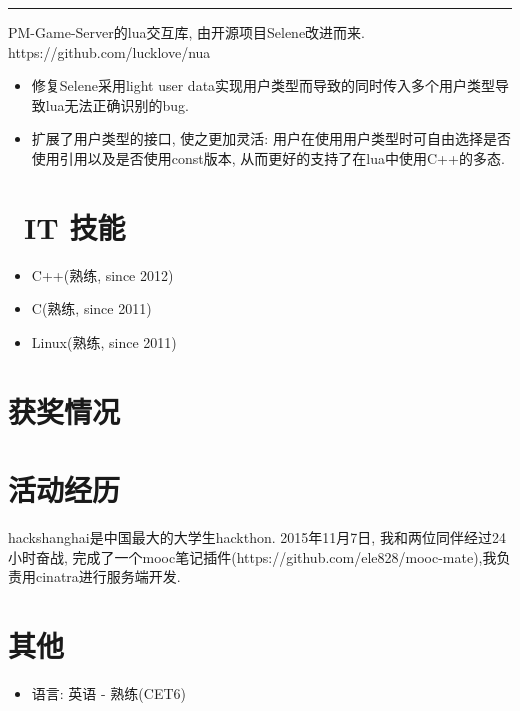 \documentclass{resume}
\newcommand{\subsectionrule}{{\vspace{-8pt}\hspace{0.5cm}\rule[1pt]{\linewidth-1cm}{0.05pt}\vspace{-8pt}}}
\begin{document}
\subsectionrule

\begin{onehalfspacing}
PM-Game-Server的lua交互库, 由开源项目Selene改进而来.
\newline
https://github.com/lucklove/nua
\begin{itemize}
  \item 修复Selene采用light user data实现用户类型而导致的同时传入多个用户类型导致lua无法正确识别的bug.
  \item 扩展了用户类型的接口, 使之更加灵活: 用户在使用用户类型时可自由选择是否使用引用以及是否使用const版本, 从而更好的支持了在lua中使用C++的多态.
\end{itemize}
\end{onehalfspacing}



\section{\faCogs\ IT 技能}
\begin{itemize}[parsep=0.5ex]
  \item C++(熟练, since 2012)
  \item C(熟练, since 2011)
  \item Linux(熟练, since 2011)
\end{itemize}

\section{\faHeartO 获奖情况}

\section{\faUsers 活动经历}
hackshanghai是中国最大的大学生hackthon. 2015年11月7日, 我和两位同伴经过24小时奋战, 完成了一个mooc笔记插件(https://github.com/ele828/mooc-mate),我负责用cinatra进行服务端开发. 

\section{\faInfo 其他}
\begin{itemize}[parsep=0.5ex]
  \item 语言: 英语 - 熟练(CET6)
\end{itemize}

%
%
\end{document}
